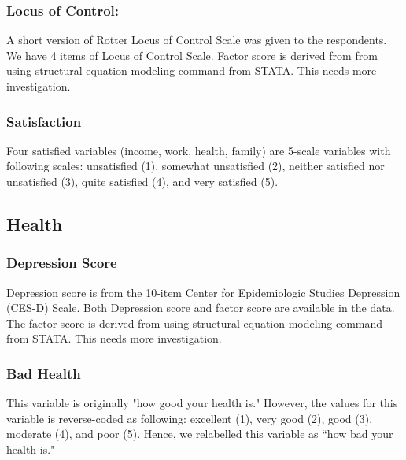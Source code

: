\documentclass[12pt]{article}
\begin{document}
\subsubsection{Locus of Control:} A short version of Rotter Locus of Control Scale was given to the respondents. We have 4 items of Locus of Control Scale. Factor score is derived from from using structural equation modeling command from STATA. This needs more investigation.

\subsubsection{Satisfaction}
 Four satisfied variables (income, work, health, family) are 5-scale variables with following scales: unsatisfied (1), somewhat unsatisfied (2), neither satisfied nor unsatisfied (3), quite satisfied (4), and very satisfied (5).

\subsection{Health}

\subsubsection{Depression Score} 
Depression score is from the 10-item Center for Epidemiologic Studies Depression (CES-D) Scale. Both Depression score and factor score are available in the data. The factor score is derived from using structural equation modeling command from STATA. This needs more investigation.

\subsubsection{Bad Health} 
This variable is originally "how good your health is." However, the values for this variable is reverse-coded as following: excellent (1), very good (2), good (3), moderate (4), and poor (5). Hence, we relabelled this variable as ``how bad your health is."
\end{document}
